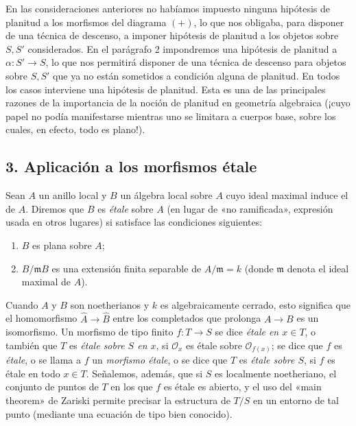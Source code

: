  En las consideraciones anteriores no habíamos impuesto
ninguna hipótesis de planitud a los morfismos del diagrama $(+)$, lo que nos
obligaba, para disponer de una técnica de descenso, a imponer hipótesis de
planitud a los objetos sobre $S,S'$ considerados. En el parágrafo 2 impondremos
una hipótesis de planitud a $\alpha:S'\longrightarrow S$, lo que nos permitirá
disponer de una técnica de descenso para objetos sobre $S,S'$ que ya no están
sometidos a condición alguna de planitud. En todos los casos interviene una
hipótesis de planitud. Esta es una de las principales razones de la importancia
de la noción de planitud en geometría algebraica (¡cuyo papel no podía
manifestarse mientras uno se limitara a cuerpos base, sobre los cuales, en
efecto, todo es plano!).

\subsection*{3. Aplicación a los morfismos étale}

Sean $A$ un anillo local y $B$ un álgebra local sobre $A$ cuyo ideal maximal
induce el de $A$. Diremos que $B$ es \emph{étale} sobre $A$ (en lugar de
«no ramificada», expresión usada en otros lugares) si satisface las condiciones
siguientes:
\begin{enumerate}
\item[(i)] $B$ es plana sobre $A$;
\item[(ii)] $B/\mathfrak mB$ es una extensión finita separable de
$A/\mathfrak m=k$ (donde $\mathfrak m$ denota el ideal maximal de $A$).
\end{enumerate}
Cuando $A$ y $B$ son noetherianos y $k$ es algebraicamente cerrado, esto
significa que el homomorfismo $\widehat A\longrightarrow\widehat B$ entre los
completados que prolonga $A\longrightarrow B$ es un isomorfismo. Un morfismo de
tipo finito $f:T\longrightarrow S$ se dice \emph{étale en $x\in T$}, o también
que $T$ es \emph{étale sobre $S$ en $x$}, si $\mathcal O_x$ es étale sobre
$\mathcal O_{f(x)}$; se dice que $f$ es \emph{étale}, o se llama a $f$ un
\emph{morfismo étale}, o se dice que $T$ es \emph{étale sobre $S$}, si $f$ es
étale en todo $x\in T$. Señalemos, además, que si $S$ es localmente
noetheriano, el conjunto de puntos de $T$ en los que $f$ es étale es abierto, y
el uso del «main theorem» de Zariski permite precisar la estructura de $T/S$
en un entorno de tal punto (mediante una ecuación de tipo bien conocido).

